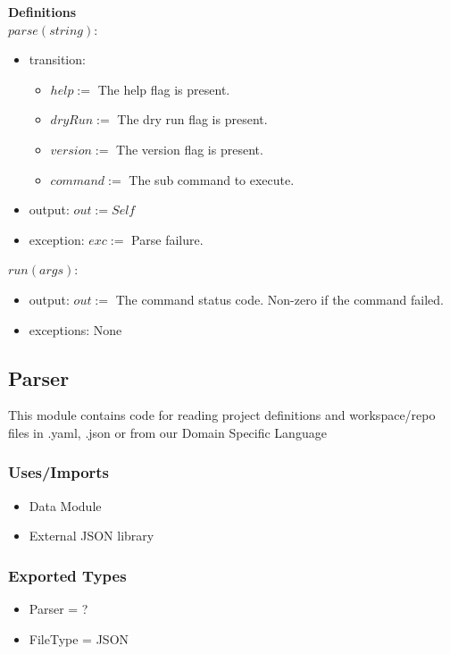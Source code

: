\documentclass[11pt]{article}
\begin{document}
\textbf{Definitions}\\

$parse(string):$
\begin{itemize}
\item transition:
  \begin{itemize}
  \item $help :=$ The help flag is present.
  \item $dryRun :=$ The dry run flag is present.
  \item $version :=$ The version flag is present.

  \item $command :=$ The sub command to execute.
  \end{itemize}
\item output: $out := Self$
\item exception: $exc :=$ Parse failure.
\end{itemize}

\vspace{1em}
$run(args):$
\begin{itemize}
\item output: $out :=$ The command status code. Non-zero if the command failed.
\item exceptions: None
\end{itemize}

\subsection{Parser}
\label{mod:parser}
This module contains code for reading project definitions and workspace/repo files
in .yaml, .json or from our Domain Specific Language
\subsubsection{Uses/Imports}
\begin{itemize}
  \item Data Module
  \item External JSON library
\end{itemize}

\subsubsection{Exported Types}
\begin{itemize}
  \item Parser = ?
  \item FileType = {JSON}
\end{itemize}
\end{document}
